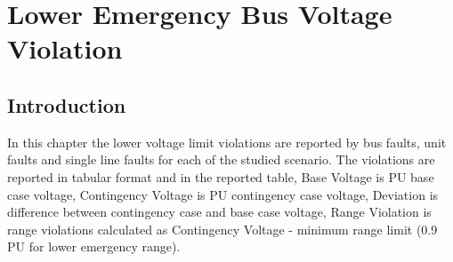 \documentclass[10pt]{report}
\begin{document}
\chapter{Lower Emergency Bus Voltage Violation}
\label{lower}
\section{Introduction}
In this chapter the lower voltage limit violations are reported by bus faults, unit faults and single line faults for each of the studied scenario.
The violations are reported in tabular format and in the reported table, Base Voltage is PU base case voltage, Contingency Voltage is PU contingency case voltage, Deviation is difference between contingency case and base case voltage, Range Violation is range violations calculated as Contingency Voltage - minimum range limit (0.9 PU for lower emergency range).
\end{document}
